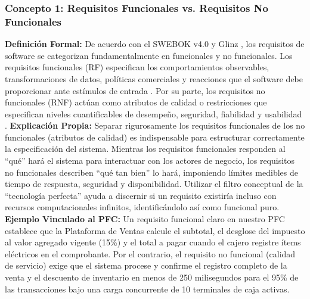 \subsubsection{Concepto 1: Requisitos Funcionales vs. Requisitos No Funcionales}
\textbf{Definición Formal:} De acuerdo con el SWEBOK v4.0 \cite{swebok2024} y Glinz \cite{glinz2007nfr}, los requisitos de software se categorizan fundamentalmente en funcionales y no funcionales. Los requisitos funcionales (RF) especifican los comportamientos observables, transformaciones de datos, políticas comerciales y reacciones que el software debe proporcionar ante estímulos de entrada \cite{pohl2025, swebok2024}. Por su parte, los requisitos no funcionales (RNF) actúan como atributos de calidad o restricciones que especifican niveles cuantificables de desempeño, seguridad, fiabilidad y usabilidad \cite{iso25010, glinz2007nfr}.
\textbf{Explicación Propia:} Separar rigurosamente los requisitos funcionales de los no funcionales (atributos de calidad) es indispensable para estructurar correctamente la especificación del sistema. Mientras los requisitos funcionales responden al ``qué'' hará el sistema para interactuar con los actores de negocio, los requisitos no funcionales describen ``qué tan bien'' lo hará, imponiendo límites medibles de tiempo de respuesta, seguridad y disponibilidad. Utilizar el filtro conceptual de la ``tecnología perfecta'' ayuda a discernir si un requisito existiría incluso con recursos computacionales infinitos, identificándolo así como funcional puro.
\textbf{Ejemplo Vinculado al PFC:} Un requisito funcional claro en nuestro PFC establece que la Plataforma de Ventas calcule el subtotal, el desglose del impuesto al valor agregado vigente (15\%) y el total a pagar cuando el cajero registre ítems eléctricos en el comprobante. Por el contrario, el requisito no funcional (calidad de servicio) exige que el sistema procese y confirme el registro completo de la venta y el descuento de inventario en menos de 250 milisegundos para el 95\% de las transacciones bajo una carga concurrente de 10 terminales de caja activas.
